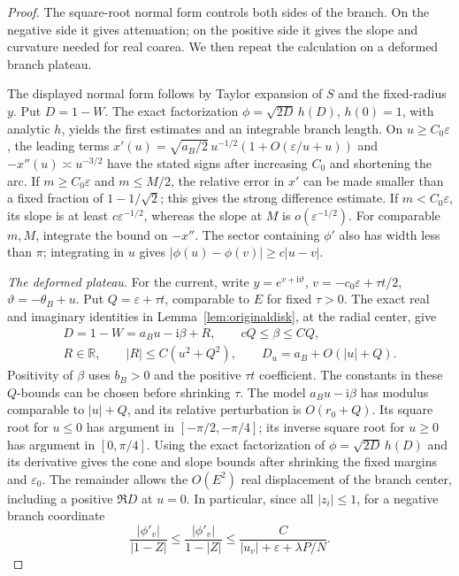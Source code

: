 \documentclass[11pt]{article}
\numberwithin{equation}{section}
\theoremstyle{definition}
\newcommand{\ii}{\mathrm i}
\newcommand{\R}{\mathbb R}
\newcommand{\eps}{\varepsilon}
\begin{document}
\begin{proof}
The square-root normal form controls both sides of the branch. On the negative side it gives attenuation; on the positive side it gives the slope and curvature needed for real coarea. We then repeat the calculation on a deformed branch plateau.

The displayed normal form follows by Taylor expansion of \(S\) and
the fixed-radius \(y\). Put \(D=1-W\).
The exact factorization \(\phi=\sqrt{2D}\,h(D)\), \(h(0)=1\),
with analytic \(h\), yields the first estimates and an integrable
branch length. On \(u\ge C_0\eps\), the leading terms
\(x'(u)=\sqrt{a_B/2}\,u^{-1/2}(1+O(\eps/u+u))\) and
\(-x''(u)\asymp u^{-3/2}\) have the stated signs after increasing
\(C_0\) and shortening the arc.
If \(m\ge C_0\eps\) and \(m\le M/2\), the relative error in
\(x'\) can be made smaller than a fixed fraction of
\(1-1/\sqrt2\); this gives the strong difference estimate.
If \(m<C_0\eps\), its slope is at least \(c\eps^{-1/2}\),
whereas the slope at \(M\) is \(o(\eps^{-1/2})\).
For comparable \(m,M\), integrate the bound on \(-x''\).
The sector containing \(\phi'\) also has width less than \(\pi\);
integrating in \(u\) gives
\(|\phi(u)-\phi(v)|\ge c|u-v|\).

\smallskip\noindent\textit{The deformed plateau.}
For the current, write \(y=e^{v+\ii\vartheta}\),
\(v=-c_0\eps+\tau t/2\), \(\vartheta=-\theta_B+u\).
Put \(Q=\eps+\tau t\), comparable to \(E\) for fixed \(\tau>0\).
The exact real and imaginary identities in
Lemma~\ref{lem:originaldisk}, at the radial center, give
\begin{gather*}
 D=1-W=a_Bu-\ii\beta+R,\qquad cQ\le\beta\le CQ,\\
 R\in\R,\qquad |R|\le C(u^2+Q^2),\qquad
 D_u=a_B+O(|u|+Q).
\end{gather*}
Positivity of \(\beta\) uses \(b_B>0\) and the positive
\(\tau t\) coefficient. The constants in these \(Q\)-bounds
can be chosen before shrinking \(\tau\). The model
\(a_Bu-\ii\beta\) has modulus comparable to \(|u|+Q\), and
its relative perturbation is \(O(r_0+Q)\). Its square root for \(u\le0\) has argument
in \([-\pi/2,-\pi/4]\); its inverse square root for \(u\ge0\)
has argument in \([0,\pi/4]\). Using the exact factorization
of \(\phi=\sqrt{2D}\,h(D)\) and its derivative gives the cone and
slope bounds after shrinking the fixed margins and \(\eps_0\).
The remainder allows the \(O(E^2)\) real displacement of the branch
center, including a positive \(\Re D\) at \(u=0\).
In particular, since all \(|z_i|\le1\), for a negative branch
coordinate
\[
 \frac{|\phi'_v|}{|1-Z|}
 \le\frac{|\phi'_v|}{1-|Z|}
 \le\frac C{|u_v|+\eps+\lambda P/N}.
\]
\end{proof}
\end{document}
